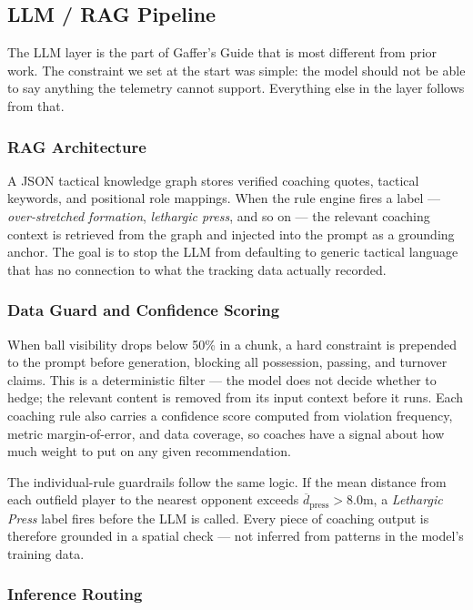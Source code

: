\documentclass[conference]{IEEEtran}
\begin{document}
\subsection{LLM / RAG Pipeline}

The LLM layer is the part of Gaffer's Guide that is most different from prior work. The constraint we set at the start was simple: the model should not be able to say anything the telemetry cannot support. Everything else in the layer follows from that.

\subsubsection{RAG Architecture}

A JSON tactical knowledge graph stores verified coaching quotes, tactical keywords, and positional role mappings. When the rule engine fires a label --- \textit{over-stretched formation}, \textit{lethargic press}, and so on --- the relevant coaching context is retrieved from the graph and injected into the prompt as a grounding anchor. The goal is to stop the LLM from defaulting to generic tactical language that has no connection to what the tracking data actually recorded.

\subsubsection{Data Guard and Confidence Scoring}

When ball visibility drops below 50\% in a chunk, a hard constraint is prepended to the prompt before generation, blocking all possession, passing, and turnover claims. This is a deterministic filter --- the model does not decide whether to hedge; the relevant content is removed from its input context before it runs. Each coaching rule also carries a confidence score computed from violation frequency, metric margin-of-error, and data coverage, so coaches have a signal about how much weight to put on any given recommendation.

The individual-rule guardrails follow the same logic. If the mean distance from each outfield player to the nearest opponent exceeds $\overline{d}_{\text{press}} > 8.0\text{m}$, a \textit{Lethargic Press} label fires before the LLM is called. Every piece of coaching output is therefore grounded in a spatial check --- not inferred from patterns in the model's training data.

\subsubsection{Inference Routing}
\end{document}
